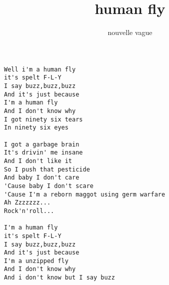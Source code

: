 \author{nouvelle vague}
\title{human fly}
\maketitle
\begin{verbatim}
Well i'm a human fly
it's spelt F-L-Y
I say buzz,buzz,buzz
And it's just because
I'm a human fly
And I don't know why
I got ninety six tears
In ninety six eyes

I got a garbage brain
It's drivin' me insane
And I don't like it
So I push that pesticide
And baby I don't care
'Cause baby I don't scare
'Cause I'm a reborn maggot using germ warfare
Ah Zzzzzzz...
Rock'n'roll...

I'm a human fly
it's spelt F-L-Y
I say buzz,buzz,buzz
And it's just because
I'm a unzipped fly
And I don't know why
And i don't know but I say buzz
\end{verbatim}